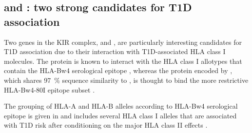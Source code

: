 


\subsection{ and : two strong candidates for T1D association}

Two genes in the \gls{KIR} complex,  and , are particularly interesting candidates for T1D association
due to their interaction with T1D-associated HLA class I molecules.
The  protein is known to interact with the HLA class I allotypes that contain the HLA-Bw4 serological
epitope \citep{Gumperz:1997ve,Vivian:2011gt}, whereas the protein encoded by , which shares \SI{97}{\percent} sequence similarity to ,
is thought to bind the more restrictive HLA-Bw4-80I epitope subset \citep{Martin:2007ik}. 

The grouping of HLA-A and HLA-B alleles according to HLA-Bw4 serological epitope \citep{Martin:2002el} is given in 
and includes several HLA class I alleles that are associated with T1D risk after conditioning on the major HLA class II effects \citep{Nejentsev:2007dv,Howson:2009bl}.  

